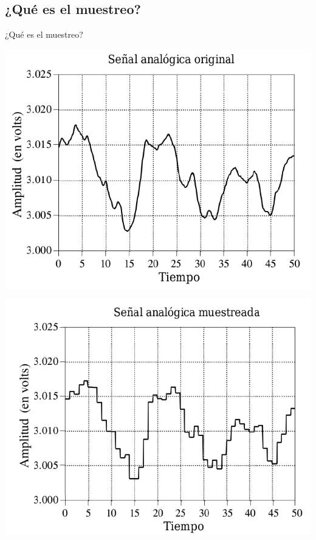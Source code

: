 \documentclass{if-beamer}
\begin{document}
\subsection{¿Qué es el muestreo?}
\begin{frame}{¿Qué es el muestreo?}
\begin{center}
\includegraphics[scale=0.40]{figuras/senal.png}
\end{center}{}
\end{frame}{}

\begin{frame}{}
\begin{center}
    \includegraphics[scale=0.4]{figuras/senal2.png}
\end{center}{}
    
\end{frame}{}
\end{document}
